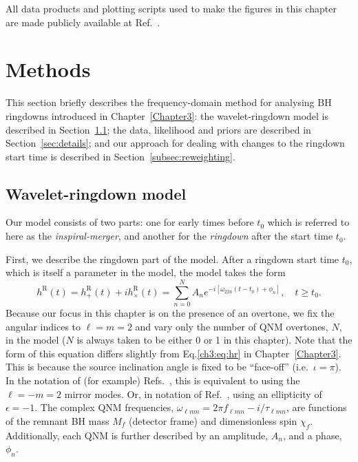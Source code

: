 All data products and plotting scripts used to make the figures in this chapter are made publicly available at Ref.~\cite{finch_eliot_2022_6949492}.


\section{Methods}\label{sec:analysis}

This section briefly describes the frequency-domain method for analysing BH ringdowns introduced in Chapter~\ref{Chapter3}:
the wavelet-ringdown model is described in Section~\ref{sec:model}; the data, likelihood and priors are described in Section~\ref{sec:details}; and our approach for dealing with changes to the ringdown start time is described in Section~\ref{subsec:reweighting}.


\subsection{Wavelet-ringdown model}\label{sec:model}

Our model consists of two parts: one for early times before $t_0$ which is referred to here as the \emph{inspiral-merger}, and another for the \emph{ringdown} after the start time $t_0$.

First, we describe the ringdown part of the model.
After a ringdown start time $t_0$, which is itself a parameter in the model, the model takes the form
\begin{equation}\label{eq:ringdown_model}
    h^\mathrm{R}(t) = h_+^\mathrm{R}(t) + ih_\times^\mathrm{R}(t) = \sum_{n=0}^N A_n e^{-i[\omega_{22n}(t-t_0) + \phi_{n}]}, \quad t \geq t_0. 
\end{equation}
Because our focus in this chapter is on the presence of an overtone, we fix the angular indices to $\ell = m = 2$ and vary only the number of QNM overtones, $N$, in the model ($N$ is always taken to be either 0 or 1 in this chapter). 
Note that the form of this equation differs slightly from Eq.\ref{ch3:eq:hr} in Chapter~\ref{Chapter3}. 
This is because the source inclination angle is fixed to be ``face-off'' (i.e.\ $\iota=\pi$).
In the notation of (for example) Refs.~\cite{Dhani:2020nik, Finch:2021iip, MaganaZertuche:2021syq}, this is equivalent to using the $\ell = -m = 2$ mirror modes. 
Or, in notation of Ref.~\cite{Isi:2021iql}, using an ellipticity of $\epsilon = -1$.
The complex QNM frequencies, $\omega_{\ell m n} = 2\pi f_{\ell m n} - i/\tau_{\ell m n}$, are functions of the remnant BH mass $M_f$ (detector frame) and dimensionless spin $\chi_f$.
Additionally, each QNM is further described by an amplitude, $A_{n}$, and a phase, $\phi_{n}$. 

